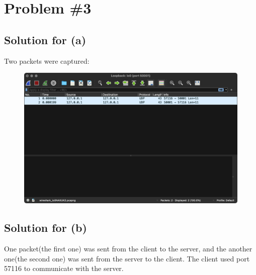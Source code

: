 \documentclass{scrartcl}
\begin{document}
\section{Problem \#3}

\subsection{Solution for (a)}
Two packets were captured:

\begin{figure}[H]
  \centering
  \includegraphics[width=0.8\linewidth]{prob3a}
\end{figure}

\subsection{Solution for (b)}
One packet(the first one) was sent from the client to the server, and the
another one(the second one) was sent from the server to the client. The client
used port 57116 to communicate with the server.
\end{document}

